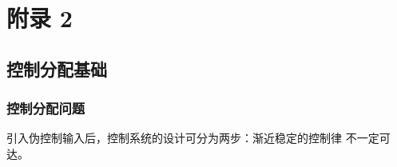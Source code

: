 \setcounter{chapter}{2}
\setcounter{section}{0}
\setcounter{equation}{0}
\setcounter{table}{0}   %
\setcounter{figure}{0}
\chapter{附\texorpdfstring{\quad}{}录 2}


\section{控制分配基础}
\subsection{控制分配问题}
%
引入伪控制输入后，控制系统的设计可分为两步：渐近稳定的控制律 不一定可达。

